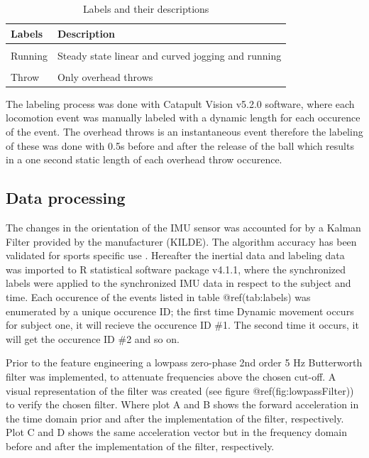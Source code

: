 \documentclass[
]{article}
\begin{document}
\begin{table}[H]

\caption{\label{tab:labels}Labels and their descriptions}
\centering
\begin{tabular}[t]{l|l}
\hline
\textbf{Labels} & \textbf{Description}\\
\hline
\cellcolor{gray!6}{Low Intensity} & \cellcolor{gray!6}{Standing and walking like movements}\\
\hline
Running & Steady state linear and curved jogging and running\\
\hline
\cellcolor{gray!6}{Dynamic} & \cellcolor{gray!6}{Multi directional movements}\\
\hline
Throw & Only overhead throws\\
\hline
\end{tabular}
\end{table}

The labeling process was done with Catapult Vision v5.2.0 software,
where each locomotion event was manually labeled with a dynamic length
for each occurence of the event. The overhead throws is an instantaneous
event therefore the labeling of these was done with 0.5s before and
after the release of the ball which results in a one second static
length of each overhead throw occurence.

\hypertarget{data-processing}{%
\subsection{Data processing}\label{data-processing}}

The changes in the orientation of the IMU sensor was accounted for by a
Kalman Filter provided by the manufacturer (KILDE). The algorithm
accuracy has been validated for sports specific use
\citep{Wundersitz2013, Wundersitz2015}. Hereafter the inertial data and
labeling data was imported to R statistical software package v4.1.1,
where the synchronized labels were applied to the synchronized IMU data
in respect to the subject and time. Each occurence of the events listed
in table @ref(tab:labels) was enumerated by a unique occurence ID; the
first time Dynamic movement occurs for subject one, it will recieve the
occurence ID \#1. The second time it occurs, it will get the occurence
ID \#2 and so on.

Prior to the feature engineering a lowpass zero-phase 2nd order 5 Hz
Butterworth filter was implemented, to attenuate frequencies above the
chosen cut-off. A visual representation of the filter was created (see
figure @ref(fig:lowpassFilter)) to verify the chosen filter. Where plot
A and B shows the forward acceleration in the time domain prior and
after the implementation of the filter, respectively. Plot C and D shows
the same acceleration vector but in the frequency domain before and
after the implementation of the filter, respectively.
\end{document}
